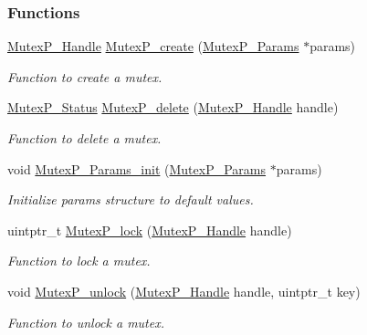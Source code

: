 \subsubsection*{Functions}
\begin{DoxyCompactItemize}
\item 
\hyperlink{_mutex_p_8h_a1bf40a0e31521bb036d1180d4338b5d9}{Mutex\+P\+\_\+\+Handle} \hyperlink{_mutex_p_8h_af05d5dc3cadfca5a06572ef7e9ead652}{Mutex\+P\+\_\+create} (\hyperlink{struct_mutex_p___params}{Mutex\+P\+\_\+\+Params} $\ast$params)
\begin{DoxyCompactList}\small\item\em Function to create a mutex. \end{DoxyCompactList}\item 
\hyperlink{_mutex_p_8h_aa73c706cf0956982c1a84a0e6fe2135d}{Mutex\+P\+\_\+\+Status} \hyperlink{_mutex_p_8h_a9a2bf10c416f8f30f60d9e42c5995a9c}{Mutex\+P\+\_\+delete} (\hyperlink{_mutex_p_8h_a1bf40a0e31521bb036d1180d4338b5d9}{Mutex\+P\+\_\+\+Handle} handle)
\begin{DoxyCompactList}\small\item\em Function to delete a mutex. \end{DoxyCompactList}\item 
void \hyperlink{_mutex_p_8h_a023e95c8429aa68dcbb98adacb1ac381}{Mutex\+P\+\_\+\+Params\+\_\+init} (\hyperlink{struct_mutex_p___params}{Mutex\+P\+\_\+\+Params} $\ast$params)
\begin{DoxyCompactList}\small\item\em Initialize params structure to default values. \end{DoxyCompactList}\item 
uintptr\+\_\+t \hyperlink{_mutex_p_8h_a2447ad3ba46c2117235253fc4abb4566}{Mutex\+P\+\_\+lock} (\hyperlink{_mutex_p_8h_a1bf40a0e31521bb036d1180d4338b5d9}{Mutex\+P\+\_\+\+Handle} handle)
\begin{DoxyCompactList}\small\item\em Function to lock a mutex. \end{DoxyCompactList}\item 
void \hyperlink{_mutex_p_8h_a3bb8c88366ec4b5c5903bf0f37924486}{Mutex\+P\+\_\+unlock} (\hyperlink{_mutex_p_8h_a1bf40a0e31521bb036d1180d4338b5d9}{Mutex\+P\+\_\+\+Handle} handle, uintptr\+\_\+t key)
\begin{DoxyCompactList}\small\item\em Function to unlock a mutex. \end{DoxyCompactList}\end{DoxyCompactItemize}


